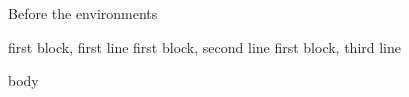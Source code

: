 Before the environments
\begin{one}
	first block, first line
	first block, second line
	first block, third line
	\begin{two} body \end{two}
\end{one}

